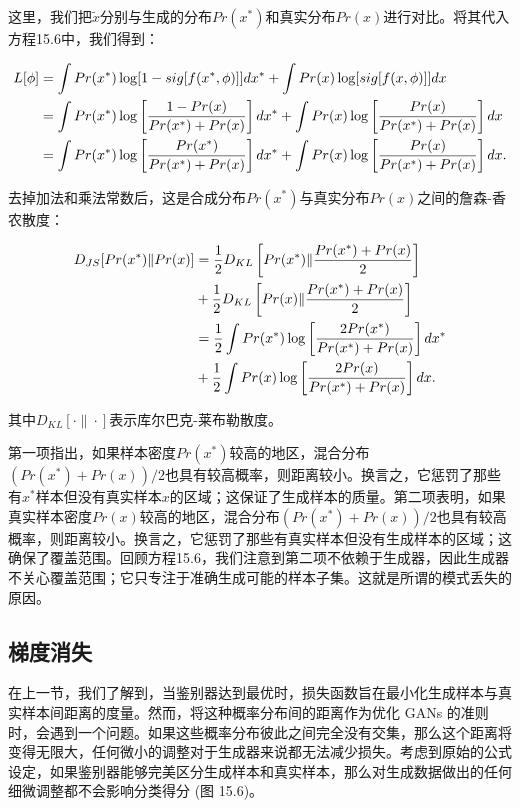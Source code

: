 这里，我们把\(\tilde{x}\)分别与生成的分布\(Pr(x^*)\)和真实分布\(Pr(x)\)进行对比。将其代入方程15.6中，我们得到：


\begin{align}
L[\phi] &= \int Pr(x^*) \log [1 - sig[f(x^*, \phi)]] dx^* + \int Pr(x) \log [sig[f(x, \phi)]] dx \notag\\
&= \int Pr(x^*) \log \left[ \frac{1 - Pr(x)}{Pr(x^*) + Pr(x)} \right] dx^* + \int Pr(x) \log \left[ \frac{Pr(x)}{Pr(x^*) + Pr(x)} \right] dx \notag \\
&= \int Pr(x^*) \log \left[ \frac{Pr(x^*)}{Pr(x^*) + Pr(x)} \right] dx^* + \int Pr(x) \log \left[ \frac{Pr(x)}{Pr(x^*) + Pr(x)} \right] dx. 
\end{align} 



去掉加法和乘法常数后，这是合成分布\(Pr(x^*)\)与真实分布\(Pr(x)\)之间的詹森-香农散度：


\begin{align}
D_{JS} [ Pr(x^*) \| Pr(x) ] &= \frac{1}{2} D_{KL} \left[ Pr(x^*) \| \frac{Pr(x^*) + Pr(x)}{2} \right] \notag \\
&+ \frac{1}{2} D_{KL} \left[ Pr(x) \| \frac{Pr(x^*) + Pr(x)}{2} \right] \notag \\
&= \frac{1}{2} \int Pr(x^*) \log \left[ \frac{2Pr(x^*)}{Pr(x^*) + Pr(x)} \right] dx^* \notag \\
&+ \frac{1}{2} \int Pr(x) \log \left[ \frac{2Pr(x)}{Pr(x^*) + Pr(x)} \right] dx. 
\end{align} 


其中\(D_{KL}[\cdot\|\cdot]\)表示库尔巴克-莱布勒散度。

第一项指出，如果样本密度\(Pr(x^*)\)较高的地区，混合分布\((Pr(x^*) + Pr(x))/2\)也具有较高概率，则距离较小。换言之，它惩罚了那些有\(x^*\)样本但没有真实样本\(x\)的区域；这保证了生成样本的质量。第二项表明，如果真实样本密度\(Pr(x)\)较高的地区，混合分布\((Pr(x^*) + Pr(x))/2\)也具有较高概率，则距离较小。换言之，它惩罚了那些有真实样本但没有生成样本的区域；这确保了覆盖范围。回顾方程15.6，我们注意到第二项不依赖于生成器，因此生成器不关心覆盖范围；它只专注于准确生成可能的样本子集。这就是所谓的模式丢失的原因。

\subsection{梯度消失}
在上一节，我们了解到，当鉴别器达到最优时，损失函数旨在最小化生成样本与真实样本间距离的度量。然而，将这种概率分布间的距离作为优化 GANs 的准则时，会遇到一个问题。如果这些概率分布彼此之间完全没有交集，那么这个距离将变得无限大，任何微小的调整对于生成器来说都无法减少损失。考虑到原始的公式设定，如果鉴别器能够完美区分生成样本和真实样本，那么对生成数据做出的任何细微调整都不会影响分类得分 (图 15.6)。

